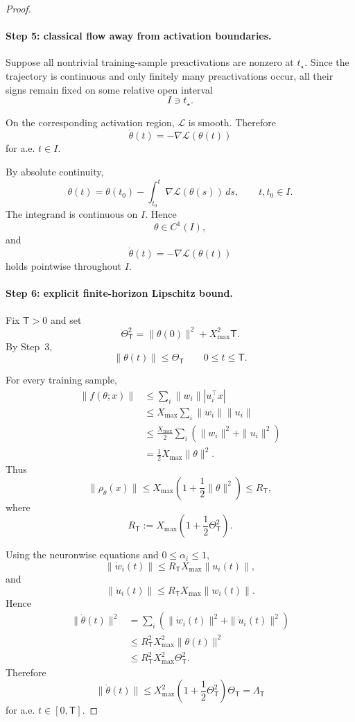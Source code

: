 \documentclass{article} %
\theoremstyle{plain}
\theoremstyle{definition}
\theoremstyle{remark}
\begin{document}
\begin{proof}
\paragraph{Step 5: classical flow away from activation boundaries.}

Suppose all nontrivial training-sample preactivations are nonzero at
$t_\star$. Since the trajectory is continuous and only finitely many
preactivations occur, all their signs remain fixed on some relative open
interval
\[
I\ni t_\star.
\]

On the corresponding activation region, $\mathcal L$ is smooth. Therefore
\[
\dot\theta(t)
=
-\nabla\mathcal L(\theta(t))
\]
for a.e. $t\in I$.

By absolute continuity,
\[
\theta(t)
=
\theta(t_0)
-
\int_{t_0}^t
\nabla\mathcal L(\theta(s))\,ds,
\qquad
t,t_0\in I.
\]
The integrand is continuous on $I$. Hence
\[
\theta\in C^1(I),
\]
and
\[
\dot\theta(t)
=
-\nabla\mathcal L(\theta(t))
\]
holds pointwise throughout $I$.

\paragraph{Step 6: explicit finite-horizon Lipschitz bound.}

Fix $\mathsf T>0$ and set
\[
\Theta_{\mathsf T}^2
=
\|\theta(0)\|^2
+
X_{\max}^2\mathsf T.
\]
By Step~3,
\[
\|\theta(t)\|
\le
\Theta_{\mathsf T}
\qquad
0\le t\le\mathsf T.
\]

For every training sample,
\[
\begin{aligned}
\|f(\theta;x)\|
&\le
\sum_i
\|w_i\|
|u_i^\top x|
\\
&\le
X_{\max}
\sum_i
\|w_i\|\|u_i\|
\\
&\le
\frac{X_{\max}}2
\sum_i
\left(
\|w_i\|^2+\|u_i\|^2
\right)
\\
&=
\frac12
X_{\max}
\|\theta\|^2.
\end{aligned}
\]
Thus
\[
\|\rho_\theta(x)\|
\le
X_{\max}
\left(
1+\frac12\|\theta\|^2
\right)
\le
R_{\mathsf T},
\]
where
\[
R_{\mathsf T}
:=
X_{\max}
\left(
1+\frac12\Theta_{\mathsf T}^2
\right).
\]

Using the neuronwise equations and $0\le\alpha_i\le1$,
\[
\|\dot w_i(t)\|
\le
R_{\mathsf T}
X_{\max}
\|u_i(t)\|,
\]
and
\[
\|\dot u_i(t)\|
\le
R_{\mathsf T}
X_{\max}
\|w_i(t)\|.
\]
Hence
\[
\begin{aligned}
\|\dot\theta(t)\|^2
&=
\sum_i
\left(
\|\dot w_i(t)\|^2
+
\|\dot u_i(t)\|^2
\right)
\\
&\le
R_{\mathsf T}^2
X_{\max}^2
\|\theta(t)\|^2
\\
&\le
R_{\mathsf T}^2
X_{\max}^2
\Theta_{\mathsf T}^2.
\end{aligned}
\]
Therefore
\[
\|\dot\theta(t)\|
\le
X_{\max}^2
\left(
1+\frac12\Theta_{\mathsf T}^2
\right)
\Theta_{\mathsf T}
=
\Lambda_{\mathsf T}
\]
for a.e. $t\in[0,\mathsf T]$.


\end{proof}
\end{document}
